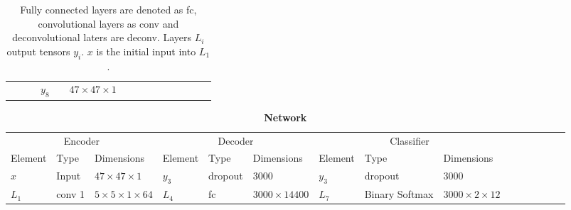 \begin{landscape}
\begin{table}[h]
{\begin{tabular}{lllllllllllllll}
				                              &          &                                                  & \multicolumn{1}{|l|}{$y_8$}  &          & \multicolumn{1}{l|}{$47\times47\times1$}          &                              &                & \multicolumn{1}{l}{}                       &   &                             &         &                             &                            &   \\ \cline{4-6}
			\end{tabular}}
		\caption{Fully connected layers are denoted as fc, convolutional layers as conv and deconvolutional laters are deconv. Layers $L_i$ output tensors $y_i$. $x$ is the initial input into $L_1$.}
    \label{tab:netIII}
	\end{table}


	\begin{table}[h] {\footnotesize
			\centering
			\caption*{\textbf{Network \networkIV}}
			\begin{tabular}{lllllllllllllll}
				\cline{1-9}
				\multicolumn{3}{|c|}{Encoder}                                                                      & \multicolumn{3}{c|}{Decoder}                                                 & \multicolumn{3}{c|}{Classifier}                                                            &  &  &  &  &  &  \\ \cline{1-9}
				\multicolumn{1}{|l|}{Element} & Type     & \multicolumn{1}{l|}{Dimensions}                  & \multicolumn{1}{l|}{Element} & Type     & \multicolumn{1}{l|}{Dimensions}                    & \multicolumn{1}{l|}{Element} & Type           & \multicolumn{1}{l|}{Dimensions}            &   &                             &   &                                           &                            &   \\ \cline{1-9}
				\multicolumn{1}{|l|}{$x$}     & Input    & \multicolumn{1}{l|}{$47\times 47 \times 1$}      & \multicolumn{1}{l|}{$y_3$}   & dropout  & \multicolumn{1}{l|}{3000}                          & \multicolumn{1}{l|}{$y_3$}   & dropout        & \multicolumn{1}{l|}{3000}                  &   &                             &   &                                           &                            &   \\ \cline{1-9}
				\multicolumn{1}{|l|}{$L_1$}   & conv 1   & \multicolumn{1}{l|}{$5\times 5\times1\times 64$} & \multicolumn{1}{l|}{$L_4$}   & fc       & \multicolumn{1}{l|}{$3000\times14400$}             & \multicolumn{1}{l|}{$L_7$}   & Binary Softmax & \multicolumn{1}{l|}{$3000\times2\times12$} &   &                             &   &                                           &                            &   \\

\end{tabular}}
\end{table}
\end{landscape}
